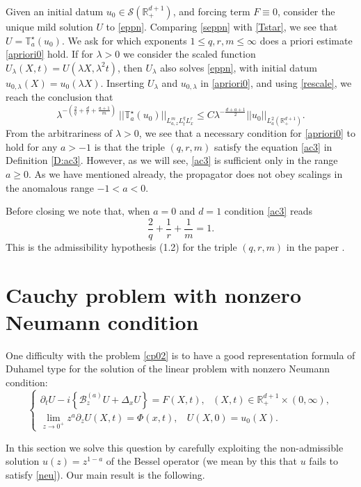 \documentclass[11pt,letter]{amsart}
\def \RN {\mathbb{R}_+^{d+1}}
\def \R {\mathbb{R}}
\newcommand{\p}{\partial}
\newcommand{\la}{\lambda}
\numberwithin{equation}{section}
\numberwithin{equation}{section}
\begin{document}
Given an initial datum $u_0\in \mathscr S(\RN)$, and forcing term $F\equiv 0$, consider the unique mild solution $U$ to \eqref{eppn}. Comparing \eqref{seppn} with \eqref{Tstar}, we see that $U = \mathbb T^\star_a(u_0)$. We ask for which exponents $1\le q, r, m\le \infty$ does a priori estimate \eqref{apriori0} hold.
If for $\la>0$ we consider the scaled function $U_\la(X,t) = U(\la X,\la^2 t)$, then $U_\la$ also solves \eqref{eppn}, with initial datum $u_{0,\la}(X) = u_0(\la X)$. Inserting $U_\la$ and $u_{0,\la}$ in \eqref{apriori0}, and using \eqref{rescale}, we reach the conclusion that 
\[
\la^{- (\frac 2q + \frac dr + \frac{a+1}m)}\ ||\mathbb T^\star_a(u_0)||_{L^m_{a,z} L^q_t L^r_x } \le C \la^{- \frac{d+a+1}2} ||u_0||_{L^2_a(\RN)}.
\]
From the arbitrariness of $\la>0$, we see that a necessary condition for \eqref{apriori0} to hold for any $a>-1$ is that the triple $(q,r,m)$ satisfy the equation \eqref{ac3} in Definition \ref{D:ac3}. However, as we will see, \eqref{ac3} is sufficient only in the range $a\ge 0$. As we have mentioned already, the propagator does not obey scalings in the anomalous range $-1<a<0$.




Before closing we note that, when $a = 0$ and $d = 1$ condition \eqref{ac3} reads 
\[
\frac 2q + \frac 1r +\frac 1m = 1.
\]
This is the admissibility hypothesis (1.2) for the triple $(q,r,m)$ in the paper \cite{OST3}.


\vskip 0.3in


\section{Cauchy problem with nonzero Neumann condition}\label{S:cpn}


One difficulty with the problem \eqref{cp02} is to have a good representation formula of Duhamel type for the solution 
of the linear problem with nonzero Neumann condition:
\begin{equation}\label{nozero}
\begin{cases}
\p_t U - i \left\{\mathscr B_z^{(a)} U +  \Delta_x U\right\} = F(X,t),\ \ \ (X,t)\in \R_+^{d+1}\times (0,\infty),
\\
\underset{z\to 0^+}{\lim} z^a \p_z U(X,t) = \Phi(x,t),\ \  \ \ U(X,0) = u_0(X).
\end{cases}
\end{equation}

In this section we solve this question by carefully exploiting the non-admissible solution $u(z) = z^{1-a}$ of the Bessel operator (we mean by this that $u$ fails to satisfy \eqref{neu}). Our main result is the following. 
\end{document}
